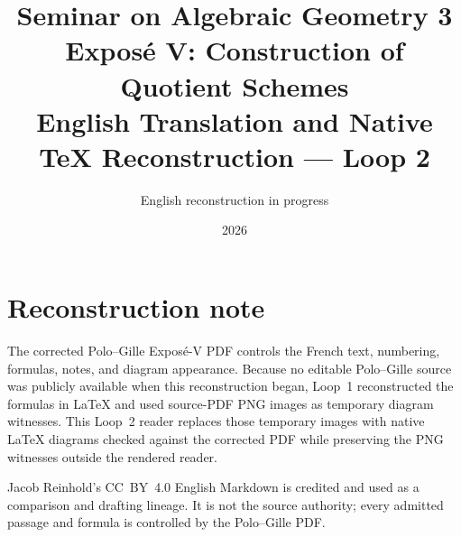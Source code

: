 \documentclass[11pt,a4paper,oneside]{book}
\title{Seminar on Algebraic Geometry 3\\
  \large Expos\'e V: Construction of Quotient Schemes\\[0.75em]
  \normalsize English Translation and Native TeX Reconstruction --- Loop 2}
\author{English reconstruction in progress}
\date{2026}
\begin{document}
\frontmatter
\maketitle

\chapter*{Reconstruction note}
The corrected Polo--Gille Expos\'e-V PDF controls the French text,
numbering, formulas, notes, and diagram appearance. Because no editable
Polo--Gille source was publicly available when this reconstruction
began, Loop~1 reconstructed the formulas in \LaTeX{} and used
source-PDF PNG images as temporary diagram witnesses. This Loop~2
reader replaces those temporary images with native \LaTeX{} diagrams
checked against the corrected PDF while preserving the PNG witnesses
outside the rendered reader.

Jacob Reinhold's CC~BY~4.0 English Markdown is credited and used as a
comparison and drafting lineage. It is not the source authority; every
admitted passage and formula is controlled by the Polo--Gille PDF.

\tableofcontents
\mainmatter
\setcounter{footnote}{0}


\end{document}

